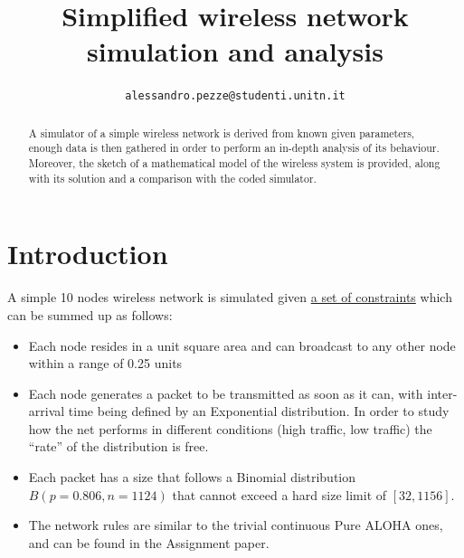\documentclass[conference]{IEEEtran}
\begin{document}
\title{Simplified wireless network simulation and analysis}

\author{
    \texttt{alessandro.pezze@studenti.unitn.it}
}

\maketitle

\begin{abstract}
A simulator of a simple wireless network is derived from known given parameters, enough data is then gathered in order to perform an in-depth analysis of its behaviour. Moreover, the sketch of a mathematical model of the wireless system is provided, along with its solution and a comparison with the coded simulator.
\end{abstract}

\section{Introduction}\label{sec:introduction}
A simple 10 nodes wireless network is simulated given \href{http://www.sharelatex.com}{a set of constraints} which can be summed up as follows:
\begin{itemize}
\item Each node resides in a unit square area and can broadcast to any other node within a range of 0.25 units
\item Each node generates a packet to be transmitted as soon as it can, with inter-arrival time being defined by an Exponential distribution. In order to study how the net performs in different conditions (high traffic, low traffic) the “rate” of the distribution is free.
\item Each packet has a size that follows a Binomial distribution \(B(p=0.806, n=1124)\) that cannot exceed a hard size limit of \([32, 1156]\).
\item The network rules are similar to the trivial continuous Pure ALOHA ones, and can be found in the Assignment paper.
\end{itemize}
\end{document}

